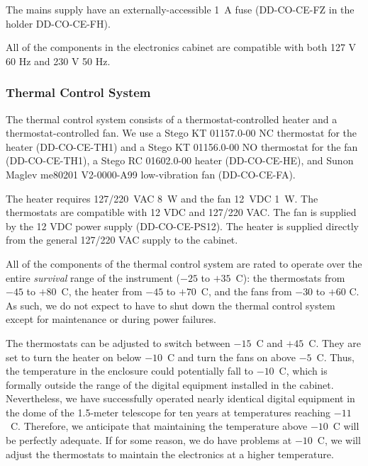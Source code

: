 \documentclass{article}
\begin{document}
The mains supply have an externally-accessible 1~A fuse (DD-CO-CE-FZ in the holder DD-CO-CE-FH).

All of the components in the electronics cabinet are compatible with both 127 V 60 Hz and 230 V 50 Hz.

\subsubsection{Thermal Control System}

The thermal control system consists of a thermostat-controlled heater and a thermostat-controlled fan. We use a Stego KT 01157.0-00 NC thermostat for the heater (DD-CO-CE-TH1) and a Stego KT 01156.0-00 NO thermostat for the fan (DD-CO-CE-TH1), a Stego RC 01602.0-00 heater (DD-CO-CE-HE), and Sunon Maglev me80201 V2-0000-A99 low-vibration fan (DD-CO-CE-FA). 

The heater requires 127/220~VAC 8~W and the fan 12~VDC 1~W. The thermostats are compatible with 12 VDC and 127/220 VAC. The fan is supplied by the 12 VDC power supply (DD-CO-CE-PS12). The heater is supplied directly from the general 127/220 VAC supply to the cabinet.

All of the components of the thermal control system are rated to operate over the entire \emph{survival} range of the instrument ($-25$ to $+35$~C): the thermostats from $-45$ to $+80$~C, the heater from $-45$ to $+70$~C, and the fans from $-30$ to $+60$ C. As such, we do not expect to have to shut down the thermal control system except for maintenance or during power failures.


The thermostats can be adjusted to switch between $-15$~C and $+45$~C. They are set to turn the heater on below $-10$~C and turn the fans on above $-5$~C. Thus, the temperature in the enclosure could potentially fall to $-10$~C, which is formally outside the range of the digital equipment installed in the cabinet. Nevertheless, we have successfully operated nearly identical digital equipment in the dome of the 1.5-meter telescope for ten years at temperatures reaching $-11$~C. Therefore, we anticipate that maintaining the temperature above $-10$~C will be perfectly adequate. If for some reason, we do have problems at $-10$~C, we will adjust the thermostats to maintain the electronics at a higher temperature.
\end{document}
